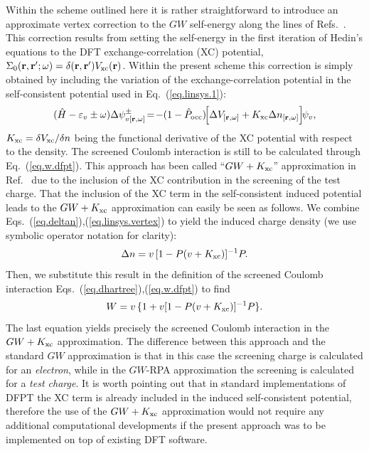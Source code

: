 \documentclass[twocolumn,prb,showpacs,superscriptaddress]{revtex4}
\def\w{\omega}
\def\H{\hat{H}}
\def\P{\hat{P}_{\rm occ}}
\def\E{\varepsilon}
\def\r{{\bf r}}
\def\rp{{\bf r^\prime}}
\begin{document}
Within the scheme outlined here it is rather straightforward to introduce
an approximate vertex correction to the $GW$ self-energy along the lines 
of Refs.\ . This correction results from setting
the self-energy in the first iteration of Hedin's equations to the DFT
exchange-correlation (XC) potential, $\Sigma_0(\r,\rp;\w) = \delta(\r,\rp) V_{\rm xc}(\r)$.
Within the present scheme this correction is simply obtained by including
the variation of the exchange-correlation
potential in the self-consistent potential used in Eq.\ (\ref{eq.linsys.1}):
  \begin{equation}\label{eq.linsys.vertex}
  (\H-\E_v\pm\w) \Delta \psi^\pm_{v[\r,\w]}\!  = \!-(1-\P)\!  \Big[\Delta V_{[\r,\w]} + K_{\rm xc}\Delta n_{[\r,\w]}\Big] \! \psi_v,
  \end{equation}
$K_{\rm xc}=\delta V_{\rm xc}/\delta n$ being the functional derivative of the XC
potential with respect to the density. The screened Coulomb interaction is still
to be calculated through Eq.\ (\ref{eq.w.dfpt}). This approach has been called 
``$GW+K_{\rm xc}$'' approximation in Ref.\  due to the inclusion of the XC contribution
in the screening of the test charge. 
That the inclusion of the XC term in the self-consistent
induced potential leads to the $GW+K_{\rm xc}$ approximation can easily be seen as follows.
We combine Eqs.\ (\ref{eq.deltan}),(\ref{eq.linsys.vertex}) to yield
the induced charge density (we use symbolic operator notation for clarity):
 \begin{equation}
 \Delta n = v\,[1- P (v+K_{\rm xc})]^{-1}P .
 \end{equation}
Then, we substitute this result in the definition of the screened Coulomb interaction
Eqs.\ (\ref{eq.dhartree}),(\ref{eq.w.dfpt}) to find
 \begin{equation}
 W = v \,\{ 1 + v [1-P(v+K_{\rm xc})]^{-1}P \}.
 \end{equation}
The last equation yields precisely the screened Coulomb interaction in the $GW+K_{\rm xc}$ approximation.\cite{hl86,reining94}
The difference between this approach and the
standard $GW$ approximation is that in this case the screening
charge is calculated for an {\it electron}, while in the $GW$-RPA approximation
the screening is calculated for a {\it test charge}.
It is worth pointing out that in standard implementations of DFPT the
XC term is already included in the induced self-consistent potential,\cite{baroni.rmp}
therefore the use of the $GW+K_{\rm xc}$ approximation would not require any additional
computational developments if the 
present approach was to be implemented on top of existing DFT software.
\end{document}
